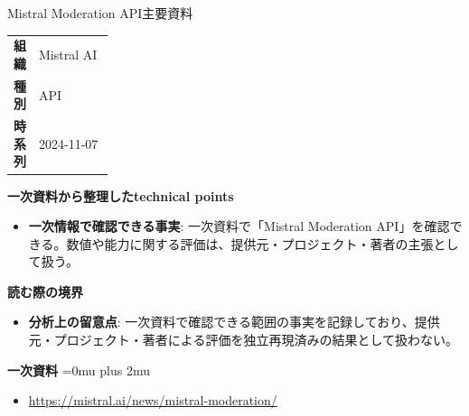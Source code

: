 \begin{technicalnote}{Mistral Moderation API}{主要資料}
\begingroup
\begin{tabularx}{\linewidth}{@{}>{\bfseries}p{0.22\linewidth}X@{}}
組織 & Mistral AI \\
種別 & API \\
時系列 & 2024-11-07 \\
\end{tabularx}
\smallskip
{\bfseries 一次資料から整理したtechnical points}
\begin{itemize}[leftmargin=1.5em,itemsep=0.35em]
\item \textbf{一次情報で確認できる事実}: 一次資料で「Mistral Moderation API」を確認できる。数値や能力に関する評価は、提供元・プロジェクト・著者の主張として扱う。
\end{itemize}
\begin{minipage}{\linewidth}
{\bfseries 読む際の境界}
\begin{itemize}[leftmargin=1.5em,itemsep=0.35em]
\item \textbf{分析上の留意点}: 一次資料で確認できる範囲の事実を記録しており、提供元・プロジェクト・著者による評価を独立再現済みの結果として扱わない。
\end{itemize}
\begin{samepage}
{\bfseries 一次資料}
\begingroup\sloppy
\Urlmuskip=0mu plus 2mu\relax
\begin{itemize}[leftmargin=1.5em,itemsep=0.25em]
\item {\scriptsize\url{https://mistral.ai/news/mistral-moderation/}}
\end{itemize}
\endgroup
\end{samepage}
\end{minipage}
\endgroup
\end{technicalnote}
\medskip

